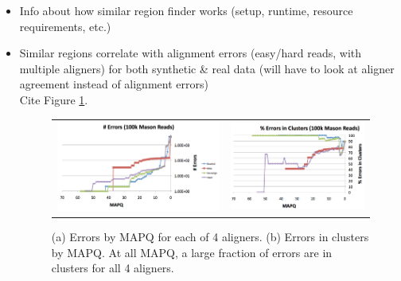 \documentclass[10pt, conference, compsocconf]{IEEEtran}
\begin{document}
\begin{itemize}
\item{Info about how similar region finder works (setup, runtime, resource requirements, etc.)}
\item{Similar regions correlate with alignment errors (easy/hard reads, with multiple aligners) for both synthetic \& real data (will have to look at aligner agreement instead of alignment errors)}\\
Cite Figure \ref{fig:errorsInClustersGraph}.\\

\begin{figure}
\centering
\begin{tabular}{c c}
\includegraphics[scale=0.3]{errorsByMapq} & \includegraphics[scale=0.3]{errorsInClusters}
\end{tabular}
\caption{(a) Errors by MAPQ for each of 4 aligners.  (b) Errors in clusters by MAPQ.  At all MAPQ, a large fraction of errors are in clusters for all 4 aligners.}
\label{fig:errorsInClustersGraph}
\end{figure}


\end{itemize}
\end{document}
